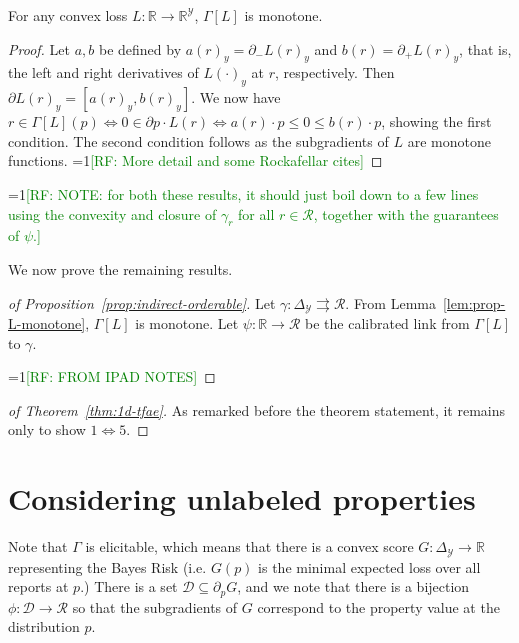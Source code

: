 \documentclass[11pt]{colt2019}
\newcommand{\Comments}{1}
\newcommand{\mynote}[2]{\ifnum\Comments=1\textcolor{#1}{#2}\fi}
\newcommand{\raf}[1]{\mynote{green}{[RF: #1]}}
\newcommand{\reals}{\mathbb{R}}
\newcommand{\prop}[1]{\Gamma[#1]}
\newcommand{\simplex}{\Delta_\Y}
\newcommand{\D}{\mathcal{D}}
\newcommand{\R}{\mathcal{R}}
\newcommand{\Y}{\mathcal{Y}}
\newcommand{\toto}{\rightrightarrows}
\begin{document}
\begin{lemma}\label{lem:prop-L-monotone}
  For any convex loss $L : \reals \to \reals^\Y$, $\prop{L}$ is monotone.
\end{lemma}
\begin{proof}
  Let $a,b$ be defined by $a(r)_y = \partial_- L(r)_y$ and $b(r) = \partial_+ L(r)_y$, that is, the left and right derivatives of $L(\cdot)_y$ at $r$, respectively.
  Then $\partial L(r)_y = [a(r)_y,b(r)_y]$.
  We now have $r \in \prop{L}(p) \iff 0 \in \partial p\cdot L(r) \iff a(r)\cdot p \leq 0 \leq b(r) \cdot p$, showing the first condition.
  The second condition follows as the subgradients of $L$ are monotone functions.
  \raf{More detail and some Rockafellar cites}
\end{proof}

\raf{NOTE: for both these results, it should just boil down to a few lines using the convexity and closure of $\gamma_r$ for all $r\in\R$, together with the guarantees of $\psi$.}

We now prove the remaining results.
\begin{proof}[of Proposition~\ref{prop:indirect-orderable}]
  Let $\gamma:\simplex\toto\R$.
  From Lemma~\ref{lem:prop-L-monotone}, $\prop{L}$ is monotone.
  Let $\psi:\reals\to\R$ be the calibrated link from $\prop{L}$ to $\gamma$.

  \raf{FROM IPAD NOTES}
\end{proof}

\begin{proof}[of Theorem~\ref{thm:1d-tfae}]
  As remarked before the theorem statement, it remains only to show $1 \iff 5$.
\end{proof}


\section{Considering unlabeled properties}
  Note that $\Gamma$ is elicitable, which means that there is a convex score $G:\simplex \to \reals$ representing the Bayes Risk (i.e. $G(p)$ is the minimal expected loss over all reports at $p$.)
  There is a set $\D \subseteq \partial_p G$, and we note that there is a bijection $\phi:\D \to \R$ so that the subgradients of $G$ correspond to the property value at the distribution $p$.
\end{document}
